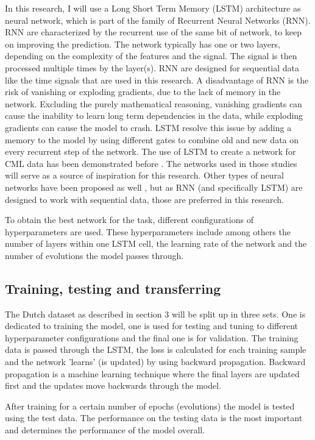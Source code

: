 \documentclass[twocolumn, 10pt, a4paper]{article}
\begin{document}
	In this research, I will use a Long Short Term Memory (LSTM) architecture as neural network, which is part of the family of Recurrent Neural Networks (RNN). RNN are characterized by the recurrent use of the same bit of network, to keep on improving the prediction. The network typically has one or two layers, depending on the complexity of the features and the signal. The signal is then processed multiple times by the layer(s). RNN are designed for sequential data like the time signals that are used in this research. A disadvantage of RNN is the risk of vanishing or exploding gradients, due to the lack of memory in the network. Excluding the purely mathematical reasoning, vanishing gradients can cause the inability to learn long term dependencies in the data, while exploding gradients can cause the model to crash. LSTM resolve this issue by adding a memory to the model by using different gates to combine old and new data on every recurrent step of the network. The use of LSTM to create a network for CML data has been demonstrated before \cite{Habi2019, Diba2021, Pudashine2020}. The networks used in those studies will serve as a source of inspiration for this research. Other types of neural networks have been proposed as well \cite{Polz2020}, but as RNN (and specifically LSTM) are designed to work with sequential data, those are preferred in this research.
	
	To obtain the best network for the task, different configurations of hyperparameters are used. These hyperparameters include among others the number of layers within one LSTM cell, the learning rate of the network and the number of evolutions the model passes through.
	
	\subsection{Training, testing and transferring}
	The  Dutch dataset as described in section 3 will be split up in three sets. One is dedicated to training the model, one is used for testing and tuning to different hyperparameter configurations and the final one is for validation. The training data is passed through the LSTM, the loss is calculated for each training sample and the network 'learns' (is updated) by using backward propagation. Backward propagation is a machine learning technique where the final layers are updated first and the updates move backwards through the model. 
	
	After training for a certain number of epochs (evolutions) the model is tested using the test data. The performance on the testing data is the most important and determines the performance of the model overall. 
	
\end{document}
